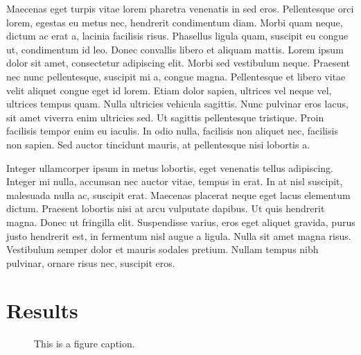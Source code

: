 \documentclass[manuscript]{geophysics}
\begin{document}
Maecenas eget turpis vitae lorem pharetra venenatis in sed eros. Pellentesque
orci lorem, egestas eu metus nec, hendrerit condimentum diam. Morbi quam neque,
dictum ac erat a, lacinia facilisis risus. Phasellus ligula quam, suscipit eu
congue ut, condimentum id leo. Donec convallis libero et aliquam mattis. Lorem
ipsum dolor sit amet, consectetur adipiscing elit. Morbi sed vestibulum neque.
Praesent nec nunc pellentesque, suscipit mi a, congue magna. Pellentesque et
libero vitae velit aliquet congue eget id lorem. Etiam dolor sapien, ultrices
vel neque vel, ultrices tempus quam. Nulla ultricies vehicula sagittis. Nunc
pulvinar eros lacus, sit amet viverra enim ultricies sed. Ut sagittis
pellentesque tristique. Proin facilisis tempor enim eu iaculis. In odio nulla,
facilisis non aliquet nec, facilisis non sapien. Sed auctor tincidunt mauris,
at pellentesque nisi lobortis a.

Integer ullamcorper ipsum in metus lobortis, eget venenatis tellus adipiscing.
Integer mi nulla, accumsan nec auctor vitae, tempus in erat. In at nisl
suscipit, malesuada nulla ac, suscipit erat. Maecenas placerat neque eget lacus
elementum dictum. Praesent lobortis nisi at arcu vulputate dapibus. Ut quis
hendrerit magna. Donec ut fringilla elit. Suspendisse varius, eros eget aliquet
gravida, purus justo hendrerit est, in fermentum nisl augue a ligula. Nulla sit
amet magna risus. Vestibulum semper dolor et mauris sodales pretium. Nullam
tempus nibh pulvinar, ornare risus nec, suscipit eros.

\section{Results}

\begin{figure}
    \centering
  \caption{This is a figure caption.}
  \label{fig:composite}
\end{figure}
\end{document}
